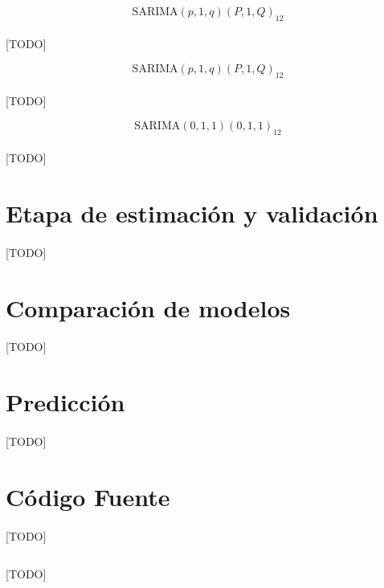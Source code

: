 \documentclass[a4paper, spanish]{article}
\begin{document}
      \begin{equation}
        \text{SARIMA}(p, 1, q)(P, 1, Q)_{12}
      \end{equation}

      \paragraph{}
      [TODO]

      \begin{equation}
        \text{SARIMA}(p, 1, q)(P, 1, Q)_{12}
      \end{equation}

      \paragraph{}
      [TODO]

      \begin{equation}
        \text{SARIMA}(0, 1, 1)(0, 1, 1)_{12}
      \end{equation}

      \paragraph{}
      [TODO]

  \section{Etapa de estimación y validación}
  \label{sec:fitting}

    \paragraph{}
    [TODO]

  \section{Comparación de modelos}
  \label{sec:comparison}

    \paragraph{}
    [TODO]

  \section{Predicción}
  \label{sec:prediction}

    \paragraph{}
    [TODO]

  \appendix
  \section{Código Fuente}
  \label{sec:code}

    \paragraph{}
    [TODO]


    \begin{listing}[H]
        \centering
        \inputminted{R}{./res/code/weight-loss.r}
        \caption{[TODO]}
        \label{}
      \end{listing}
\end{document}
